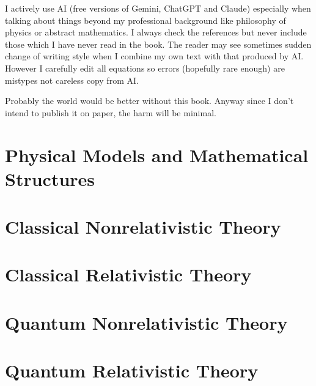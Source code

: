 \documentclass[russian,english]{book}
\begin{document}
 I actively use AI (free versions of Gemini, ChatGPT and Claude) especially when 
 talking about things beyond my professional background like philosophy of 
 physics or abstract mathematics. I always check the references but never 
 include those which I have never read in the book. The reader may see 
 sometimes sudden change of writing style when I combine my own text 
 with that produced by AI. However I carefully edit all equations so
 errors (hopefully rare enough) are mistypes not careless copy from AI.

 Probably the world would be better without this book.
 Anyway since I don't intend to publish it on paper, the harm will
be minimal.

\tableofcontents                        

\mainmatter
\part{Physical Models and Mathematical Structures}



%

\part{Classical Nonrelativistic Theory}
%




\part{Classical Relativistic Theory}



\part{Quantum Nonrelativistic Theory}
\part{Quantum Relativistic Theory}
\appendix







\backmatter
\printbibliography[
heading=bibintoc,
title={Bibliography}
] 
\clearpage
\end{document}
